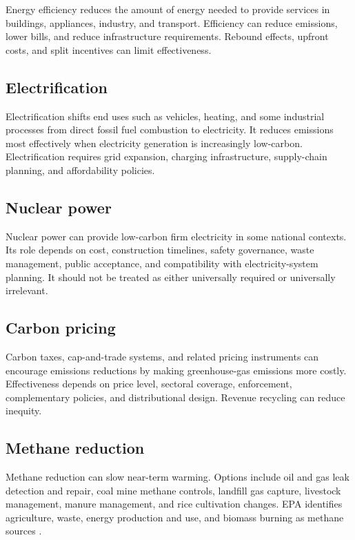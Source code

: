 \documentclass[12pt]{article}
\begin{document}
Energy efficiency reduces the amount of energy needed to provide services in buildings, appliances, industry, and transport. Efficiency can reduce emissions, lower bills, and reduce infrastructure requirements. Rebound effects, upfront costs, and split incentives can limit effectiveness.

\subsection{Electrification}

Electrification shifts end uses such as vehicles, heating, and some industrial processes from direct fossil fuel combustion to electricity. It reduces emissions most effectively when electricity generation is increasingly low-carbon. Electrification requires grid expansion, charging infrastructure, supply-chain planning, and affordability policies.

\subsection{Nuclear power}

Nuclear power can provide low-carbon firm electricity in some national contexts. Its role depends on cost, construction timelines, safety governance, waste management, public acceptance, and compatibility with electricity-system planning. It should not be treated as either universally required or universally irrelevant.

\subsection{Carbon pricing}

Carbon taxes, cap-and-trade systems, and related pricing instruments can encourage emissions reductions by making greenhouse-gas emissions more costly. Effectiveness depends on price level, sectoral coverage, enforcement, complementary policies, and distributional design. Revenue recycling can reduce inequity.

\subsection{Methane reduction}

Methane reduction can slow near-term warming. Options include oil and gas leak detection and repair, coal mine methane controls, landfill gas capture, livestock management, manure management, and rice cultivation changes. EPA identifies agriculture, waste, energy production and use, and biomass burning as methane sources \cite{ref4}.
\end{document}
